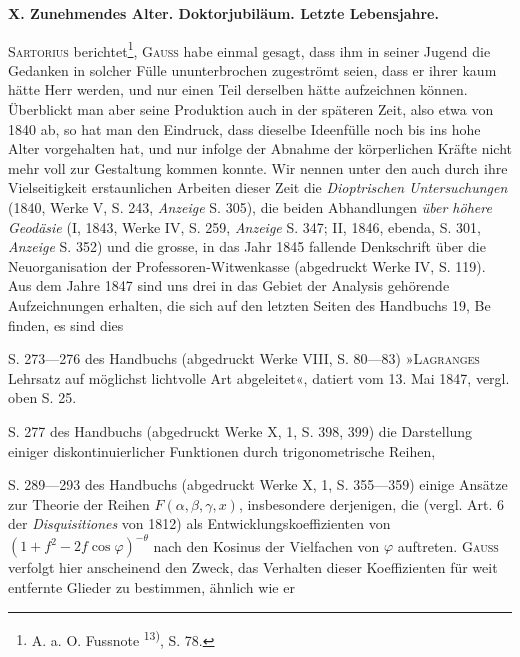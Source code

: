 \par\clearpage{}
\begin{center}
\textbf{X. Zunehmendes Alter. Doktorjubiläum. Letzte Lebensjahre.}\par
{}\par
{}
\end{center}
\noindent\hspace*{\parindent}\textsc{Sartorius} berichtet\footnote{A. a. O. Fussnote \textsuperscript{13)}, S. 78.}, \textsc{Gauss} habe einmal gesagt, dass ihm in seiner
Jugend die Gedanken in solcher Fülle ununterbrochen zugeströmt seien, dass
er ihrer kaum hätte Herr werden, und nur einen Teil derselben hätte
aufzeichnen können. Überblickt man aber seine Produktion auch in der
späteren Zeit, also etwa von 1840 ab, so hat man den Eindruck, dass dieselbe
Ideenfülle noch bis ins hohe Alter vorgehalten hat, und nur infolge der
Abnahme der körperlichen Kräfte nicht mehr voll zur Gestaltung kommen
konnte. Wir nennen unter den auch durch ihre Vielseitigkeit erstaunlichen
Arbeiten dieser Zeit die \textit{Dioptrischen Untersuchungen} (1840, Werke V, S. 243,
\textit{Anzeige} S. 305), die beiden Abhandlungen \textit{über höhere Geodäsie} (I, 1843,
Werke IV, S. 259, \textit{Anzeige} S. 347; II, 1846, ebenda, S. 301, \textit{Anzeige} S. 352)
und die grosse, in das Jahr 1845 fallende Denkschrift über die Neuorganisation
der Professoren-Witwenkasse (abgedruckt Werke IV, S. 119). Aus dem
Jahre 1847 sind uns drei in das Gebiet der Analysis gehörende Aufzeichnungen
erhalten, die sich auf den letzten Seiten des Handbuchs 19, Be finden,
es sind dies
\begin{list}{}{\setlength{\leftmargin}{2em}\setlength{\labelwidth}{1.5em}\setlength{\labelsep}{.5em}\setlength{\itemsep}{0pt}\setlength{\parsep}{0pt}\setlength{\topsep}{0pt}}
\item[1)] S. 273—276 des Handbuchs (abgedruckt Werke VIII, S. 80—83) »\textsc{Lagranges} Lehrsatz auf möglichst lichtvolle Art abgeleitet«, datiert vom
13. Mai 1847, vergl. oben S. 25.
\item[2)] S. 277 des Handbuchs (abgedruckt Werke X, 1, S. 398, 399) die Darstellung
einiger diskontinuierlicher Funktionen durch trigonometrische
Reihen,
\item[3)] S. 289—293 des Handbuchs (abgedruckt Werke X, 1, S. 355—359) einige
Ansätze zur Theorie der Reihen \(F(\alpha,\beta,\gamma,x)\), insbesondere derjenigen, die
(vergl. Art. 6 der \textit{Disquisitiones} von 1812) als Entwicklungskoeffizienten
von \((1+f^2-2f\cos\varphi)^{-\theta}\) nach den Kosinus der Vielfachen von \(\varphi\) auftreten.
\textsc{Gauss} verfolgt hier anscheinend den Zweck, das Verhalten dieser
Koeffizienten für weit entfernte Glieder zu bestimmen, ähnlich wie er
\end{list}
